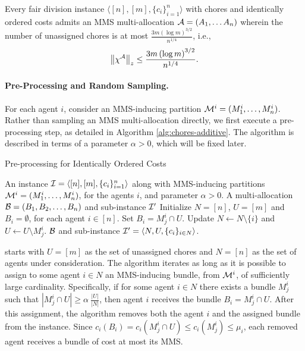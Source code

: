 \begin{theorem}
\label{thm:additive_chores}
    Every fair division instance $\langle [n], [m], \{c_i\}_{i=1}^n \rangle$ with chores and identically ordered costs admits an MMS multi-allocation $\mathcal{A}=(A_1,\ldots A_n)$ wherein the number of unassigned chores is at most $\frac{3m \left( \log m \right)^{3/2}}{n^{1/4}}$, i.e., 
    $$\left\|\chi^{\mathcal{A}}\right\|_z \leq \frac{3m \left( \log m \right)^{3/2}}{n^{1/4}}.$$
\end{theorem}


\paragraph{Pre-Processing and Random Sampling.} For each agent $i$, consider an MMS-inducing partition $\mathcal{M}^i=(M^i_1,\ldots,M^i_n)$. Rather than sampling an MMS multi-allocation directly, we first execute a pre-processing step, as detailed in Algorithm \ref{alg:chores-additive}. The algorithm is described in terms of a parameter $\alpha>0$, which will be fixed later. 


\begin{algorithm}
\caption{Pre-processing for Identically Ordered Costs}\label{alg:chores-additive}
\begin{algorithmic}[1]
    \REQUIRE An instance $\mathcal{I} = \langle [n], [m], \{c_i\}_{i=1}^n \rangle$ along with MMS-inducing partitions $\mathcal{M}^i=(M^i_1,\ldots,M^i_n)$, for the agents $i$, and parameter $\alpha>0$.
    \ENSURE A multi-allocation $\mathcal{B}=(B_1,B_2,\dots,B_n)$ and sub-instance $\mathcal{I}'$
    \STATE Initialize $N=[n]$, $U=[m]$ and $B_i=\emptyset$, for each agent $i\in[n]$.
        \STATE Set $B_i=M^i_j\cap U$. 
        \STATE Update $N \leftarrow N\setminus \{i\}$ and $U \leftarrow U\setminus M^i_j$.
    \ENDWHILE
    \RETURN $\mathcal{B}$ and sub-instance $\mathcal{I}'=\langle N, U, \{ c_i \}_{i \in N} \rangle$.
\end{algorithmic}
\end{algorithm}

 starts with $U = [m]$ as the set of unassigned chores and $N = [n]$ as the set of agents under consideration. The algorithm iterates as long as it is possible to assign to some agent $i \in N$ an MMS-inducing bundle, from $\mathcal{M}^i$, of sufficiently large cardinality. Specifically, if for some agent $i \in N$ there exists a bundle $M^i_j$ such that $|M^i_j \cap U| \geq \alpha \ \frac{|U|}{|N|}$, then agent $i$ receives the bundle $B_i = M^i_j \cap U$. After this assignment, the algorithm removes both the agent $i$ and the assigned bundle from the instance. Since $c_i(B_i)=c_i(M^i_j\cap U)\leq c_i(M^i_j)\leq \mu_i$, each removed agent receives a bundle of cost at most its MMS.

